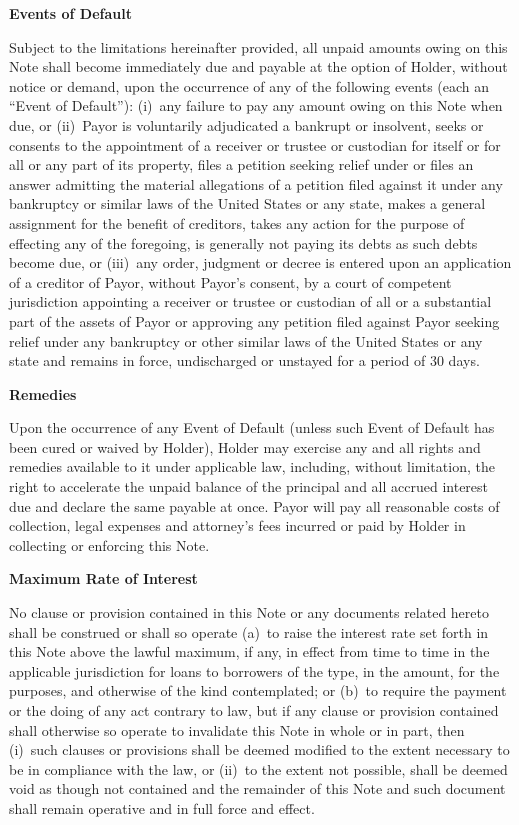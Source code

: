 \par\medskip\noindent\textbf{Events of Default}\par
Subject to the limitations hereinafter provided, all unpaid amounts owing on this Note shall
become immediately due and payable at the option of Holder, without notice or demand, upon
the occurrence of any of the following events (each an ``Event of Default''): (i)~any failure
to pay any amount owing on this Note when due, or (ii)~Payor is voluntarily adjudicated a
bankrupt or insolvent, seeks or consents to the appointment of a receiver or trustee or
custodian for itself or for all or any part of its property, files a petition seeking relief
under or files an answer admitting the material allegations of a petition filed against it
under any bankruptcy or similar laws of the United States or any state, makes a general
assignment for the benefit of creditors, takes any action for the purpose of effecting any of
the foregoing, is generally not paying its debts as such debts become due, or (iii)~any
order, judgment or decree is entered upon an application of a creditor of Payor, without
Payor's consent, by a court of competent jurisdiction appointing a receiver or trustee or
custodian of all or a substantial part of the assets of Payor or approving any petition filed
against Payor seeking relief under any bankruptcy or other similar laws of the United States
or any state and remains in force, undischarged or unstayed for a period of 30 days.

\par\medskip\noindent\textbf{Remedies}\par
Upon the occurrence of any Event of Default (unless such Event of Default has been cured or
waived by Holder), Holder may exercise any and all rights and remedies available to it under
applicable law, including, without limitation, the right to accelerate the unpaid balance of
the principal and all accrued interest due and declare the same payable at once. Payor will
pay all reasonable costs of collection, legal expenses and attorney's fees incurred or paid by
Holder in collecting or enforcing this Note.

\par\medskip\noindent\textbf{Maximum Rate of Interest}\par
No clause or provision contained in this Note or any documents related hereto shall be
construed or shall so operate (a)~to raise the interest rate set forth in this Note above the
lawful maximum, if any, in effect from time to time in the applicable jurisdiction for loans
to borrowers of the type, in the amount, for the purposes, and otherwise of the kind
contemplated; or (b)~to require the payment or the doing of any act contrary to law, but if
any clause or provision contained shall otherwise so operate to invalidate this Note in whole
or in part, then (i)~such clauses or provisions shall be deemed modified to the extent
necessary to be in compliance with the law, or (ii)~to the extent not possible, shall be
deemed void as though not contained and the remainder of this Note and such document shall
remain operative and in full force and effect.


